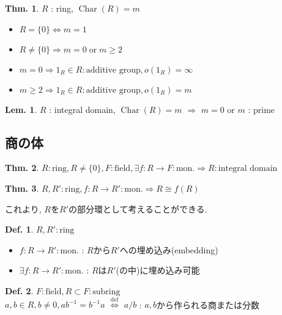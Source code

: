 \documentclass[uplatex,dvipdfmx,9pt]{beamer}
\newcommand{\defarrow}{\overset{\mathrm{def}}{\Leftrightarrow}}
\newcommand{\inverse}[1]{#1^{-1}}
\newcommand{\Char}[1]{\operatorname{Char}(#1)}
\newcommand{\mon}{\text{mon.}} %
\newcommand{\sscount}{\textsection \thesubsection}
\newcounter{textLemCount}
\newcounter{textExmCount}
\theoremstyle{definition} %
\newtheorem{defn}{Def.}[subsection] %
\newtheorem{thm}{Thm.}[subsection] %
\newtheorem{lemText}[textLemCount]{Lem.} %
\theoremstyle{example}
\begin{document}
    \begin{frame}

     \begin{thm}
      $R$ : ring, $\Char{R} = m$
      \begin{itemize}
        \item $R = \{0\} \Leftrightarrow m = 1$
        \item $R \neq \{0\} \Rightarrow m = 0 \; \text{or} \; m \ge 2$
        \item $m = 0 \Rightarrow 1_R \in R : \text{additive group}, o(1_R) = \infty$
        \item $m \ge 2 \Rightarrow 1_R \in R : \text{additive group}, o(1_R) = m$
      \end{itemize}
    \end{thm} 

    \begin{lemText}
      $R$ : integral domain, $\Char{R} = m$ $\Rightarrow$ $m = 0$ or $m$ : prime
    \end{lemText}

    \end{frame}

    \subsection{\sscount 商の体}
    \setcounter{textExmCount}{0}

    \begin{frame}

      \begin{thm}
        $R : \text{ring}, R \neq \{0\}, F : \text{field}, \exists f\colon R \to F : \mon \Rightarrow R : \text{integral domain}$
      \end{thm}

      \begin{thm}
        $R, R' : \text{ring}, f\colon R \to R' : \mon \Rightarrow R \cong f(R)$
      \end{thm}
      これより, $R$を$R'$の部分環として考えることができる.

      \begin{defn}
        $R, R' : \text{ring}$
        \begin{itemize}
          \item $f\colon R \to R' : \mon$ : $R$から$R'$への\alert{埋め込み(embedding)}
          \item $\exists f\colon R \to R' : \mon$ : $R$は$R'$(の中)に\alert{埋め込み可能}
        \end{itemize}
      \end{defn}
 
      \begin{defn}
        $F : \text{field}, R \subset F : \text{subring}$ \\
        $a, b \in R, b \neq 0, a\inverse{b} = \inverse{b}a$ $\defarrow$ $a/b$ : $a, b$から作られる商または分数
      \end{defn}
     
    \end{frame}
\end{document}
